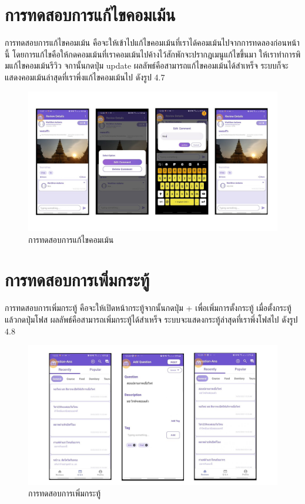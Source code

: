 \section{การทดสอบการแก้ไขคอมเม้น}
การทดสอบการแก้ไขคอมเม้น คือจะให้เข้าไปแก้ไขคอมเม้นที่เราได้คอมเม้นไปจากการทดลองก่อนหน้านี้ โดยการแก้ไขคือให้กดคอมเม้นที่เราคอมเม้นไปค้างไว้สักพักจะปรากฎเมนูแก้ไขขึ้นมา
ให้เราทำการพิมแก้ไขคอมเม้นรีวิว จกานั้นกดปุ่ม update ผลลัพธ์คือสามารถแก้ไขคอมเม้นได้สำเหร็จ ระบบก็จะแสดงคอมเม้นล่าสุดที่เราพึ่งแก้ไขคอมเม้นไป ดังรูป 4.7 

\begin{figure}
    \begin{center}
      \includegraphics[width=1\textwidth]{./image/testing/Slide8.JPG}
    \end{center}
    \caption[การทดสอบการแก้ไขคอมเม้น]{การทดสอบการแก้ไขคอมเม้น}
    \end{figure}
    
\section{การทดสอบการเพิ่มกระทู้}
การทดสอบการเพิ่มกระทู้ คือจะให้เปิดหน้ากระทู้จากนั้นกดปุ่ม + เพื่อเพิ่มการตั้งกระทู้ เมื่อตั้งกระทู้แล้วกดปุ่มโฟส 
ผลลัพธ์คือสามารถเพิ่มกระทู้ได้สำเหร็จ ระบบจะแสดงกระทู้ล่าสุดที่เราพึ่งโฟสไป  ดังรูป 4.8

\begin{figure}
    \begin{center}
      \includegraphics[width=1\textwidth]{./image/testing/Slide9.JPG}
    \end{center}
    \caption[การทดสอบการเพิ่มกระทู้]{การทดสอบการเพิ่มกระทู้}
    \end{figure}

